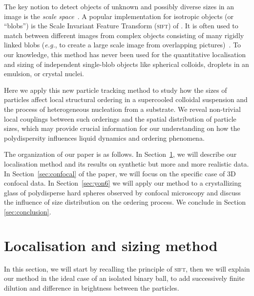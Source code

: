 \documentclass[8.5pt,twoside,twocolumn]{article}
\begin{document}
The key notion to detect objects of unknown and possibly diverse sizes in an image is the \emph{scale space}~\cite{Lindeberg1993}. A popular implementation for isotropic objects (or ``blobs'') is the Scale Invariant Feature Transform (\textsc{sift}) of \citet{Lowe2004}. It is often used to match between different images from complex objects consisting of many rigidly linked blobs (\emph{e.g.}, to create a large scale image from overlapping pictures)~\citep{Lowe2004, Urschler2006, Cheung2009}. To our knowledge, this method has never been used for the quantitative localisation and sizing of independent single-blob objects like spherical colloids, droplets in an emulsion, or crystal nuclei. 

Here we apply this new particle tracking method to study how the sizes of particles affect local structural ordering 
in a supercooled colloidal suspension and the process of heterogeneous nucleation from a substrate. 
We reveal non-trivial local couplings between such orderings and the spatial distribution of particle sizes, which may provide crucial information for our understanding 
on how the polydispersity influences liquid dynamics and ordering phenomena.    

The organization of our paper is as follows. 
In Section~\ref{sec:method}, we will describe our localisation method and its results on synthetic but more and more realistic data. In Section~\ref{sec:confocal} of the paper, we will focus on the specific case of 3D confocal data. In Section~\ref{sec:yon6} we will apply our method to a crystallizing glass of polydisperse hard spheres observed by confocal microscopy and discuss the influence of size distribution on the ordering process. We conclude in Section \ref{sec:conclusion}. 

\section{Localisation and sizing method}
\label{sec:method}

In this section, we will start by recalling the principle of \textsc{sift}, then we will explain our method in the ideal case of an isolated binary ball, to add successively finite dilution and difference in brightness between the particles.
\end{document}
